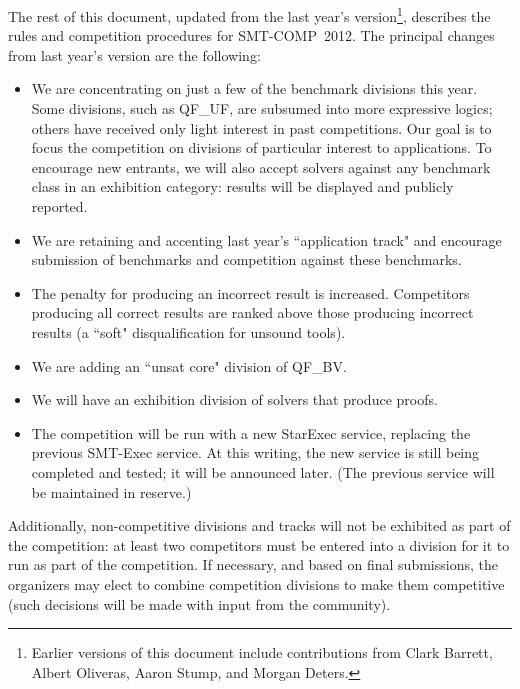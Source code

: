 \documentclass[12pt]{article}
\begin{document}
The rest of this document, updated from the last year's
version\footnote{Earlier versions of this document include contributions from
Clark Barrett, Albert Oliveras, Aaron Stump, and Morgan Deters.},
describes the rules and competition procedures for SMT-COMP~2012.
The principal changes from last year's version are the following:

\begin{itemize}

\item We are concentrating on just a few of the benchmark divisions this year.
  Some divisions, such as QF\_UF, are subsumed into more expressive
  logics; others have received only light interest in past competitions. Our goal is to
  focus the competition on divisions of particular interest to
  applications. To encourage new entrants, we will also accept
  solvers against any benchmark class in an exhibition category:
  results will be displayed and publicly reported.

\item We are retaining and accenting last year's ``application track" and
  encourage submission of benchmarks and competition against these
  benchmarks.

\item The penalty for producing an incorrect result is increased. Competitors
  producing all correct results are ranked above those producing
  incorrect results (a ``soft" disqualification for unsound tools).

\item We are adding an ``unsat core" division of QF\_BV.

\item We will have an exhibition division of solvers that produce proofs.

\item The competition will be run with a new StarExec service, replacing
  the previous SMT-Exec service. At this writing, the new service is
  still being completed and tested; it will be announced later. (The
  previous service will be maintained in reserve.)

\end{itemize}

Additionally, non-competitive divisions and tracks will not be exhibited as
part of the competition: at least two competitors must be entered
into a division for it to run as part of the competition.
If necessary, and based on final submissions, the organizers may elect to
combine competition divisions to make them competitive (such decisions will
be made with input from the community).
\end{document}
